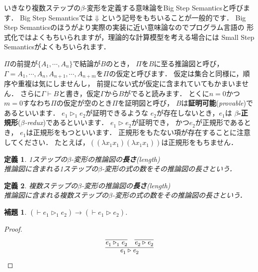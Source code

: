 \documentclass{ltjsbook}%
\newtheorem{lemma}{補題}[section]%
\newtheorem{definition}{定義}[section]%
\newcommand\term[2]{\textbf{#1}{(\textit{#2})}}%
\begin{document}
いきなり複数ステップの$\beta$-変形を定義する意味論をBig Step Semanticsと呼びます．%
Big Step Semanticsでは$\Downarrow$という記号をもちいることが一般的です．%
Big Step Semanticsのほうがより実際の実装に近い意味論なのでプログラム言語の%
形式化ではよくもちいられますが，理論的な計算模型を考える場合には%
Small Step Semanticsがよくもちいられます．%
\par$\Pi$の前提が$\{A_1^{},\cdots,A_n^{}\}$で結論が$B$のとき，%
$\Pi$を$B$に至る推論図と呼び，%
$\Gamma=A_1^{},\cdots,A_n^{},A_{n+1}^{},\cdots,A_{n+m}^{}$を$\Pi$の仮定と呼びます．%
仮定は集合と同様に，順序や重複は気にしませんし，%
前提にない式が仮定に含まれていてもかまいません．%
さらに$\Gamma\vdash B$と書き，仮定$\Gamma$から$B$がでると読みます．%
とくに$n=0$かつ$m=0$すなわち$\Pi$の仮定が空のとき$\Pi$を証明図と呼び，%
$B$は\term{証明可能}{provable}であるといいます．%
$\mathit{e}_1^{}\triangleright_1^{}\mathit{e}_2^{}$が証明できるような%
$\mathit{e}_2^{}$が存在しないとき，$\mathit{e}_1^{}$は%
\term{$\beta$-正規形}{$\beta$-redux}であるといいます．%
$\mathit{e}_1^{}\triangleright\mathit{e}_2^{}$が証明でき，%
かつ$\mathit{e}_2^{}$が正規形であるとき，%
$\mathit{e}_1^{}$は正規形をもつといいます．%
正規形をもたない項が存在することに注意してください．%
たとえば，$((\lambda x_1^{}x_1^{})(\lambda x_1^{}x_1^{}))$は正規形をもちません．%
\begin{definition}%
  1ステップの$\beta$-変形の推論図の\term{長さ}{length}\\%
  推論図に含まれる1ステップの$\beta$-変形の式の数をその推論図の長さという．%
\end{definition}%
\begin{definition}%
  複数ステップの$\beta$-変形の推論図の\term{長さ}{length}\\%
  推論図に含まれる複数ステップの$\beta$-変形の式の数をその推論図の長さという．%
\end{definition}%
\begin{lemma}%
  \label{lemma:beta_reduct1n}%
  $(\vdash\mathit{e}_1^{}\triangleright_1^{}\mathit{e}_2^{})\rightarrow%
  (\vdash\mathit{e}_1^{}\triangleright\mathit{e}_2^{})$.%
\end{lemma}%
\begin{proof}%
  \begin{equation}%
    \infer{%
      \mathit{e}_1^{}\triangleright\mathit{e}_2^{}%
    }{%
      \infer{\mathit{e}_1^{}\triangleright_1^{}\mathit{e}_2^{}}{}%
    &%
      \infer{\mathit{e}_2^{}\triangleright\mathit{e}_2^{}}{}%
    }%
  \end{equation}%
\end{proof}%
\end{document}
